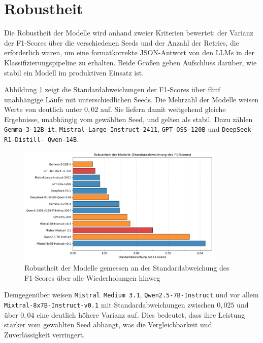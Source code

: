 \section{Robustheit}\label{sec:robustheit}

Die Robustheit der Modelle wird anhand zweier Kriterien bewertet: der Varianz der F1-Scores über die verschiedenen Seeds und der Anzahl der Retries, die erforderlich waren, um eine formatkorrekte JSON-Antwort von den \acp{LLM} in der Klassifizierungspipeline zu erhalten. Beide Größen geben Aufschluss darüber, wie stabil ein Modell im produktiven Einsatz ist.

Abbildung \ref{fig:results-evaluation-robustness-f1-std} zeigt die Standardabweichungen der F1‑Scores über fünf unabhängige Läufe mit unterschiedlichen Seeds. Die Mehrzahl der Modelle weisen Werte von deutlich unter $0{,}02$ auf. Sie liefern damit weitgehend gleiche Ergebnisse, unabhängig vom gewählten Seed, und gelten als stabil. Dazu zählen \texttt{Gemma-3-12B-it}, \texttt{Mistral-Large-Instruct-2411}, \texttt{GPT-OSS-120B} und \texttt{DeepSeek-R1-Distill-\linebreak~Qwen-14B}.

\begin{figure}[h]
    \centering
    \includegraphics[width=0.88\textwidth]{images/results/evaluation_robustness_f1_std}
    \caption{Robustheit der Modelle gemessen an der Standardabweichung des F1-Scores über alle Wiederholungen hinweg}
    \label{fig:results-evaluation-robustness-f1-std}
\end{figure}

Demgegenüber weisen \texttt{Mistral Medium 3.1}, \texttt{Qwen2.5-7B-Instruct} und vor allem \texttt{Mixtral-8x7B-Instruct-v0.1} mit Standardabweichungen zwischen $0{,}025$ und über $0{,}04$ eine deutlich höhere Varianz auf. Dies bedeutet, dass ihre Leistung stärker vom gewählten Seed abhängt, was die Vergleichbarkeit und Zuverlässigkeit verringert.

